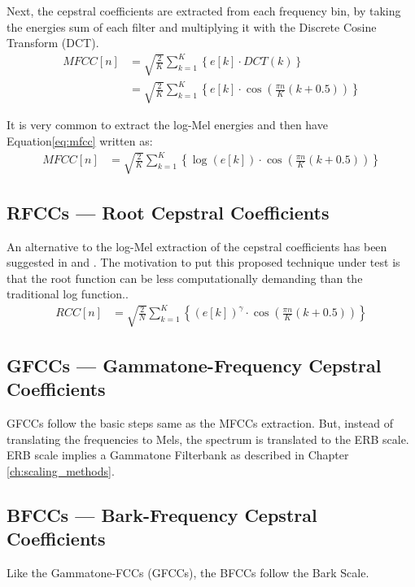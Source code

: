 Next, the cepstral coefficients are extracted from each frequency bin, 
by taking the energies sum of each filter and multiplying it
with the Discrete Cosine Transform (DCT).
\begin{align}\label{eq:mfcc}
    MFCC[n] & = \sqrt{\frac{2}{K}} \sum_{k=1}^{K} \left\{ 
        e[k] \cdot DCT\left( k \right)
     \right\} \nonumber \\
     & = \sqrt{\frac{2}{K}} \sum_{k=1}^{K} \left\{ 
        e[k] \cdot \cos \left( \frac{\pi n}{K} (k+0.5) \right)
     \right\}
\end{align}

It is very common to extract the log-Mel energies
and then have Equation\;\ref{eq:mfcc} written as:
\begin{align}\label{eq:logmfcc}
    MFCC[n] & = \sqrt{\frac{2}{K}} \sum_{k=1}^{K} \left\{ 
        \log \left( e[k] \right) \cdot \cos \left( \frac{\pi n}{K} (k+0.5) \right)
     \right\}
\end{align}


\subsection{RFCCs --- Root Cepstral Coefficients}
An alternative to the log-Mel 
extraction of the cepstral coefficients
has been suggested in \cite{rmfcc1} and \cite{1415167}.
The motivation to put this proposed 
technique under test is that the root 
function can be less computationally demanding 
than the traditional log function..
\begin{align}
    RCC[n] & = \sqrt{\frac{2}{N}} \sum_{k=1}^{K} \left\{ 
        \left( e[k] \right)^{\gamma} \cdot \cos \left( \frac{\pi n}{K} (k+0.5) \right)
     \right\}
\end{align}

\subsection{GFCCs --- Gammatone-Frequency Cepstral Coefficients}
GFCCs follow the basic steps same as the MFCCs extraction.
But, instead of translating the frequencies to Mels,
the spectrum is translated to the ERB scale.
ERB scale implies a Gammatone Filterbank as described in Chapter \ref{ch:scaling_methods}.


\subsection{BFCCs --- Bark-Frequency Cepstral Coefficients}
Like the Gammatone-FCCs (GFCCs), the BFCCs follow the Bark Scale.

